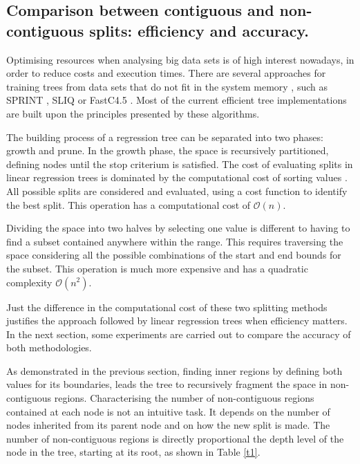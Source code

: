 \documentclass[times,twocolumn,final,authoryear]{elsarticle}
\begin{document}
\subsection{Comparison between contiguous and non-contiguous splits: efficiency and accuracy.} 

Optimising resources when analysing big data sets is of high interest nowadays, in order to reduce costs and execution times. There are several approaches for training trees from data sets that do not fit in the system memory \citep{Rokach2016}, such as SPRINT \citep{Shareretal1996}, SLIQ \citep{Mehtaetal1996} or FastC4.5 \citep{Heetal2007}. Most of the current efficient tree implementations are built upon the principles presented by these algorithms.

The building process of a regression tree can be separated into two phases: growth and prune. In the growth phase, the space is recursively partitioned, defining nodes until the stop criterium is satisfied. The cost of evaluating splits in linear regression trees is dominated by the computational cost of sorting values \citep{Shareretal1996}. All possible splits are considered and evaluated, using a cost function to identify the best split. This operation has a computational cost of $\mathcal{O}(n)$.

Dividing the space into two halves by selecting one value is different to having to find a subset contained anywhere within the range. This requires traversing the space considering all the possible combinations of the start and end bounds for the subset. This operation is much more expensive and has a quadratic complexity $\mathcal{O}(n^2)$.

Just the difference in the computational cost of these two splitting methods justifies the approach followed by linear regression trees when efficiency matters. In the next section, some experiments are carried out to compare the accuracy of both methodologies.

As demonstrated in the previous section, finding inner regions by defining both values for its boundaries, leads the tree to recursively fragment the space in non-contiguous regions. Characterising the number of non-contiguous regions contained at each node is not an intuitive task. It depends on the number of nodes inherited from its parent node and on how the new split is made. The number of non-contiguous regions is directly proportional the depth level of the node in the tree, starting at its root, as shown in Table \ref{t1}.
\end{document}
